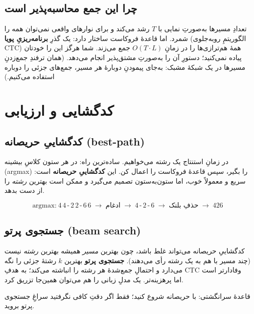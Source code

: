 \documentclass[12pt,a4paper]{article}
\begin{document}
\subsection{چرا این جمع محاسبه‌پذیر است}

تعدادِ مسیرها به‌صورتِ نمایی با $T$ رشد می‌کند و برای نوارهای واقعی نمی‌توان همه را شمرد. اما قاعدهٔ فروکاست ساختار دارد: یک گذرِ \textbf{برنامه‌ریزیِ پویا} (الگوریتمِ رو‌به‌جلوی CTC) همهٔ هم‌ترازی‌ها را در زمانِ $O(T\cdot L)$ جمع می‌زند. شما هرگز این را خودتان پیاده نمی‌کنید؛ دستورِ  آن را به‌صورتِ مشتق‌پذیر انجام می‌دهد. (همان ترفندِ جمع‌زدنِ مسیرها در یک شبکهٔ مشبک: به‌جای پیمودنِ دوبارهٔ هر مسیر، جمع‌های جزئی را دوباره استفاده می‌کنیم.)

\section{کدگشایی و ارزیابی}

\subsection{کدگشاییِ حریصانه (best-path)}

در زمانِ استنتاج یک رشته می‌خواهیم. ساده‌ترین راه: در هر ستون کلاسِ بیشینه (argmax) را بگیر، سپس قاعدهٔ فروکاست را اعمال کن. این \textbf{کدگشاییِ حریصانه} است: سریع و معمولاً خوب، اما ستون‌به‌ستون تصمیم می‌گیرد و ممکن است بهترین \emph{رشته} را از دست بدهد.

\begin{riyazi}
\[
\text{argmax:}\ 4\,4\,\text{-}\,2\,2\,\text{-}\,6\,6
\;\to\; \text{ادغام} \;\to\; 4\,\text{-}\,2\,\text{-}\,6
\;\to\; \text{حذفِ بلنک} \;\to\; 426
\]
\end{riyazi}

\subsection{جستجوی پرتو (beam search)}

کدگشاییِ حریصانه می‌تواند غلط باشد، چون بهترین \emph{مسیر} همیشه بهترین \emph{رشته} نیست (چند مسیر با هم به یک رشته رأی می‌دهند). \textbf{جستجوی پرتو} بهترین $k$ رشتهٔ جزئی را نگه می‌دارد و احتمالِ جمع‌شدهٔ هر رشته را انباشته می‌کند؛ به هدفِ CTC وفادارتر است اما پرهزینه‌تر. یک مدلِ زبانی را هم می‌توان همین‌جا تزریق کرد.

\begin{nokte}
قاعدهٔ سرانگشتی: با حریصانه شروع کنید؛ فقط اگر دقتِ کافی نگرفتید سراغِ جستجوی پرتو بروید.
\end{nokte}
\end{document}
